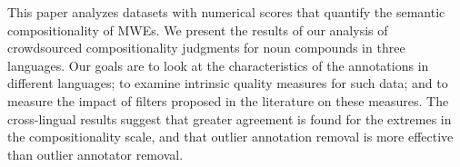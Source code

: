 This paper analyzes datasets with numerical scores that quantify the semantic compositionality of MWEs. We present the results of our analysis of crowdsourced compositionality judgments for noun compounds in three languages. Our goals are to look at the characteristics of the annotations in different languages; to examine intrinsic quality measures for such data; and to measure the impact of filters proposed in the literature on these measures. The cross-lingual results suggest that greater agreement is found for the extremes in the compositionality scale, and that outlier annotation removal is more effective than outlier annotator removal.
